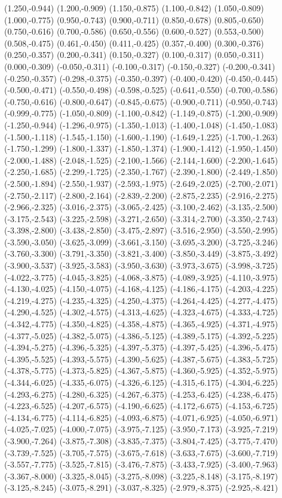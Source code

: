 (1.250,-0.944) (1.200,-0.909) (1.150,-0.875) (1.100,-0.842) (1.050,-0.809) (1.000,-0.775) (0.950,-0.743) (0.900,-0.711) (0.850,-0.678) (0.805,-0.650) (0.750,-0.616) (0.700,-0.586) (0.650,-0.556) (0.600,-0.527) (0.553,-0.500) (0.508,-0.475) (0.461,-0.450) (0.411,-0.425) (0.357,-0.400) (0.300,-0.376) (0.250,-0.357) (0.200,-0.341) (0.150,-0.327) (0.100,-0.317) (0.050,-0.311) (0.000,-0.309) (-0.050,-0.311) (-0.100,-0.317) (-0.150,-0.327) (-0.200,-0.341) (-0.250,-0.357) (-0.298,-0.375) (-0.350,-0.397) (-0.400,-0.420) (-0.450,-0.445) (-0.500,-0.471) (-0.550,-0.498) (-0.598,-0.525) (-0.641,-0.550) (-0.700,-0.586) (-0.750,-0.616) (-0.800,-0.647) (-0.845,-0.675) (-0.900,-0.711) (-0.950,-0.743) (-0.999,-0.775) (-1.050,-0.809) (-1.100,-0.842) (-1.149,-0.875) (-1.200,-0.909) (-1.250,-0.944) (-1.296,-0.975) (-1.350,-1.013) (-1.400,-1.048) (-1.450,-1.083) (-1.500,-1.118) (-1.545,-1.150) (-1.600,-1.190) (-1.649,-1.225) (-1.700,-1.263) (-1.750,-1.299) (-1.800,-1.337) (-1.850,-1.374) (-1.900,-1.412) (-1.950,-1.450) (-2.000,-1.488) (-2.048,-1.525) (-2.100,-1.566) (-2.144,-1.600) (-2.200,-1.645) (-2.250,-1.685) (-2.299,-1.725) (-2.350,-1.767) (-2.390,-1.800) (-2.449,-1.850) (-2.500,-1.894) (-2.550,-1.937) (-2.593,-1.975) (-2.649,-2.025) (-2.700,-2.071) (-2.750,-2.117) (-2.800,-2.164) (-2.839,-2.200) (-2.875,-2.235) (-2.916,-2.275) (-2.966,-2.325) (-3.016,-2.375) (-3.065,-2.425) (-3.100,-2.462) (-3.135,-2.500) (-3.175,-2.543) (-3.225,-2.598) (-3.271,-2.650) (-3.314,-2.700) (-3.350,-2.743) (-3.398,-2.800) (-3.438,-2.850) (-3.475,-2.897) (-3.516,-2.950) (-3.550,-2.995) (-3.590,-3.050) (-3.625,-3.099) (-3.661,-3.150) (-3.695,-3.200) (-3.725,-3.246) (-3.760,-3.300) (-3.791,-3.350) (-3.821,-3.400) (-3.850,-3.449) (-3.875,-3.492) (-3.900,-3.537) (-3.925,-3.583) (-3.950,-3.630) (-3.973,-3.675) (-3.998,-3.725) (-4.022,-3.775) (-4.045,-3.825) (-4.068,-3.875) (-4.089,-3.925) (-4.110,-3.975) (-4.130,-4.025) (-4.150,-4.075) (-4.168,-4.125) (-4.186,-4.175) (-4.203,-4.225) (-4.219,-4.275) (-4.235,-4.325) (-4.250,-4.375) (-4.264,-4.425) (-4.277,-4.475) (-4.290,-4.525) (-4.302,-4.575) (-4.313,-4.625) (-4.323,-4.675) (-4.333,-4.725) (-4.342,-4.775) (-4.350,-4.825) (-4.358,-4.875) (-4.365,-4.925) (-4.371,-4.975) (-4.377,-5.025) (-4.382,-5.075) (-4.386,-5.125) (-4.389,-5.175) (-4.392,-5.225) (-4.394,-5.275) (-4.396,-5.325) (-4.397,-5.375) (-4.397,-5.425) (-4.396,-5.475) (-4.395,-5.525) (-4.393,-5.575) (-4.390,-5.625) (-4.387,-5.675) (-4.383,-5.725) (-4.378,-5.775) (-4.373,-5.825) (-4.367,-5.875) (-4.360,-5.925) (-4.352,-5.975) (-4.344,-6.025) (-4.335,-6.075) (-4.326,-6.125) (-4.315,-6.175) (-4.304,-6.225) (-4.293,-6.275) (-4.280,-6.325) (-4.267,-6.375) (-4.253,-6.425) (-4.238,-6.475) (-4.223,-6.525) (-4.207,-6.575) (-4.190,-6.625) (-4.172,-6.675) (-4.153,-6.725) (-4.134,-6.775) (-4.114,-6.825) (-4.093,-6.875) (-4.071,-6.925) (-4.050,-6.971) (-4.025,-7.025) (-4.000,-7.075) (-3.975,-7.125) (-3.950,-7.173) (-3.925,-7.219) (-3.900,-7.264) (-3.875,-7.308) (-3.835,-7.375) (-3.804,-7.425) (-3.775,-7.470) (-3.739,-7.525) (-3.705,-7.575) (-3.675,-7.618) (-3.633,-7.675) (-3.600,-7.719) (-3.557,-7.775) (-3.525,-7.815) (-3.476,-7.875) (-3.433,-7.925) (-3.400,-7.963) (-3.367,-8.000) (-3.325,-8.045) (-3.275,-8.098) (-3.225,-8.148) (-3.175,-8.197) (-3.125,-8.245) (-3.075,-8.291) (-3.037,-8.325) (-2.979,-8.375) (-2.925,-8.421) 
